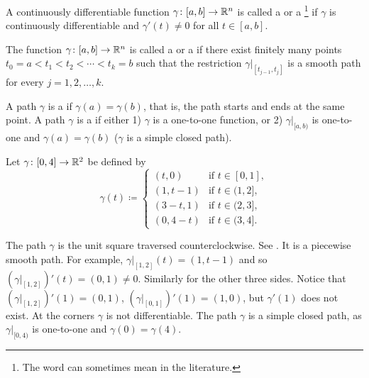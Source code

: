 \begin{defn}
A continuously differentiable function $\gamma \colon [a,b] \to {\mathbb{R}}^n$ is
called a \emph{}
or a
\emph{}\footnote{The
word  can sometimes mean
 in the literature.}
if
$\gamma$ is continuously differentiable and
$\gamma'(t) \neq 0$ for all $t \in [a,b]$.

The function $\gamma \colon [a,b] \to {\mathbb{R}}^n$ is called a
\emph{} or a
\emph{}
if there exist finitely many points
$t_0 = a < t_1 < t_2 < \cdots < t_k = b$ such that
the restriction $\gamma|_{[t_{j-1},t_j]}$ is a smooth path for every
$j=1,2,\ldots,k$.

A path $\gamma$ is 
a \emph{} if $\gamma(a) = \gamma(b)$, that is,
the path starts and ends at the same point.
A path $\gamma$ is a \emph{} if 
either 1) $\gamma$ is a one-to-one function, or 2)
$\gamma|_{[a,b)}$ is one-to-one and $\gamma(a)=\gamma(b)$ ($\gamma$ is a
simple closed path).
\end{defn}


\begin{example} \label{mv:example:unitsquarepath}
Let $\gamma \colon [0,4] \to {\mathbb{R}}^2$ be defined by
\begin{equation*}
\gamma(t) \coloneqq
\begin{cases}
(t,0)   & \text{if } t \in [0,1],\\
(1,t-1) & \text{if } t \in (1,2],\\
(3-t,1) & \text{if } t \in (2,3],\\
(0,4-t) & \text{if } t \in (3,4].
\end{cases}
\end{equation*}
\begin{myfigureht}
\caption{The path $\gamma$ traversing the unit square.\label{fig:squarepath}}
\end{myfigureht}

The path $\gamma$ is the unit square traversed
counterclockwise.  See .  It is
a piecewise smooth path.  For example,
$\gamma|_{[1,2]}(t) = (1,t-1)$ and so
$(\gamma|_{[1,2]})'(t) = (0,1) \neq 0$.  Similarly for the other three sides.
Notice
that
$(\gamma|_{[1,2]})'(1) = (0,1)$,
$(\gamma|_{[0,1]})'(1) = (1,0)$, but
$\gamma'(1)$ does not exist.  At the corners $\gamma$ is 
not differentiable.
The path $\gamma$ is a simple closed path, as $\gamma|_{[0,4)}$ is
one-to-one and $\gamma(0)=\gamma(4)$.
\end{example}

